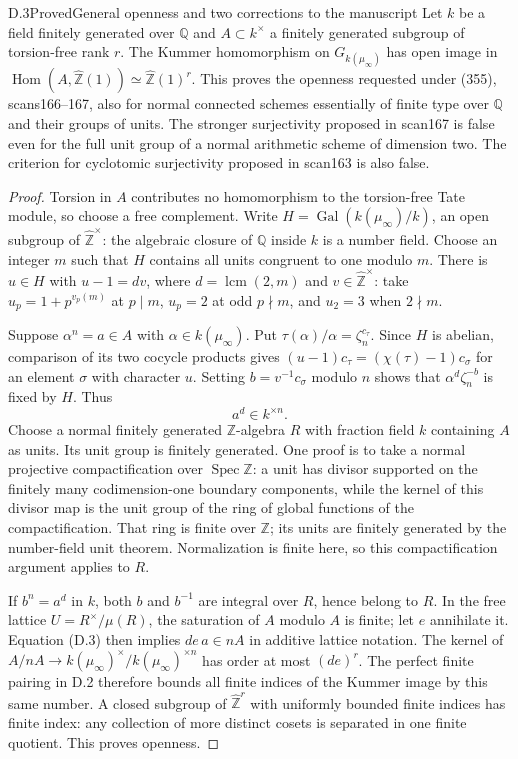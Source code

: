 \begin{statement}{D.3}{Proved}{General openness and two corrections to the manuscript}
Let $k$ be a field finitely generated over $\mathbb Q$ and $A\subset k^\times$ a finitely generated subgroup of torsion-free rank $r$. The Kummer homomorphism on $G_{k(\mu_\infty)}$ has open image in $\operatorname{Hom}(A,\widehat{\mathbb Z}(1))\simeq\widehat{\mathbb Z}(1)^r$. This proves the openness requested under (355), scans166--167, also for normal connected schemes essentially of finite type over $\mathbb Q$ and their groups of units. The stronger surjectivity proposed in scan167 is false even for the full unit group of a normal arithmetic scheme of dimension two. The criterion for cyclotomic surjectivity proposed in scan163 is also false.
\end{statement}
\begin{proof}
Torsion in $A$ contributes no homomorphism to the torsion-free Tate module, so choose a free complement. Write $H=\operatorname{Gal}(k(\mu_\infty)/k)$, an open subgroup of $\widehat{\mathbb Z}^{\times}$: the algebraic closure of $\mathbb Q$ inside $k$ is a number field. Choose an integer $m$ such that $H$ contains all units congruent to one modulo $m$. There is $u\in H$ with $u-1=dv$, where $d=\operatorname{lcm}(2,m)$ and $v\in\widehat{\mathbb Z}^{\times}$: take $u_p=1+p^{v_p(m)}$ at $p\mid m$, $u_p=2$ at odd $p\nmid m$, and $u_2=3$ when $2\nmid m$.

Suppose $\alpha^n=a\in A$ with $\alpha\in k(\mu_\infty)$. Put $\tau(\alpha)/\alpha=\zeta_n^{c_\tau}$. Since $H$ is abelian, comparison of its two cocycle products gives
$(u-1)c_\tau=(\chi(\tau)-1)c_\sigma$ for an element $\sigma$ with character $u$. Setting $b=v^{-1}c_\sigma$ modulo $n$ shows that $\alpha^d\zeta_n^{-b}$ is fixed by $H$. Thus
\[
 a^d\in k^{\times n}.                                      \tag{D.3}
\]
Choose a normal finitely generated $\mathbb Z$-algebra $R$ with fraction field $k$ containing $A$ as units. Its unit group is finitely generated. One proof is to take a normal projective compactification over $\operatorname{Spec}\mathbb Z$: a unit has divisor supported on the finitely many codimension-one boundary components, while the kernel of this divisor map is the unit group of the ring of global functions of the compactification. That ring is finite over $\mathbb Z$; its units are finitely generated by the number-field unit theorem. Normalization is finite here, so this compactification argument applies to $R$.

If $b^n=a^d$ in $k$, both $b$ and $b^{-1}$ are integral over $R$, hence belong to $R$. In the free lattice $U=R^\times/\mu(R)$, the saturation of $A$ modulo $A$ is finite; let $e$ annihilate it. Equation (D.3) then implies $de\,a\in nA$ in additive lattice notation. The kernel of $A/nA\to k(\mu_\infty)^\times/k(\mu_\infty)^{\times n}$ has order at most $(de)^r$. The perfect finite pairing in D.2 therefore bounds all finite indices of the Kummer image by this same number. A closed subgroup of $\widehat{\mathbb Z}^r$ with uniformly bounded finite indices has finite index: any collection of more distinct cosets is separated in one finite quotient. This proves openness.


\end{proof}
